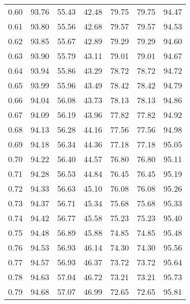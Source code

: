 \begin{tabular}{|c|c|c|c|c|c|c|}
      0.60 &     93.76 &     55.43 &      42.48 &   79.75 &      79.75 &         94.47 \\
      0.61 &     93.80 &     55.56 &      42.68 &   79.57 &      79.57 &         94.53 \\
      0.62 &     93.85 &     55.67 &      42.89 &   79.29 &      79.29 &         94.60 \\
      0.63 &     93.90 &     55.79 &      43.11 &   79.01 &      79.01 &         94.67 \\
      0.64 &     93.94 &     55.86 &      43.29 &   78.72 &      78.72 &         94.72 \\
      0.65 &     93.99 &     55.96 &      43.49 &   78.42 &      78.42 &         94.79 \\
      0.66 &     94.04 &     56.08 &      43.73 &   78.13 &      78.13 &         94.86 \\
      0.67 &     94.09 &     56.19 &      43.96 &   77.82 &      77.82 &         94.92 \\
      0.68 &     94.13 &     56.28 &      44.16 &   77.56 &      77.56 &         94.98 \\
      0.69 &     94.18 &     56.34 &      44.36 &   77.18 &      77.18 &         95.05 \\
      0.70 &     94.22 &     56.40 &      44.57 &   76.80 &      76.80 &         95.11 \\
      0.71 &     94.28 &     56.53 &      44.84 &   76.45 &      76.45 &         95.19 \\
      0.72 &     94.33 &     56.63 &      45.10 &   76.08 &      76.08 &         95.26 \\
      0.73 &     94.37 &     56.71 &      45.34 &   75.68 &      75.68 &         95.33 \\
      0.74 &     94.42 &     56.77 &      45.58 &   75.23 &      75.23 &         95.40 \\
      0.75 &     94.48 &     56.89 &      45.88 &   74.85 &      74.85 &         95.48 \\
      0.76 &     94.53 &     56.93 &      46.14 &   74.30 &      74.30 &         95.56 \\
      0.77 &     94.57 &     56.93 &      46.37 &   73.72 &      73.72 &         95.64 \\
      0.78 &     94.63 &     57.04 &      46.72 &   73.21 &      73.21 &         95.73 \\
      0.79 &     94.68 &     57.07 &      46.99 &   72.65 &      72.65 &         95.81 \\

\end{tabular}

